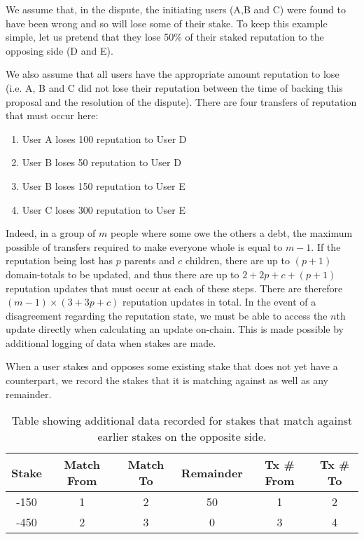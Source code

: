 We assume that, in the dispute, the initiating users (A,B and C) were found to have been wrong and so will lose some of their stake. To keep this example simple, let us pretend that they lose 50\% of their staked reputation to the opposing side (D and E).

We also assume that all users have the appropriate amount reputation to lose (i.e. A, B and C did not lose their reputation between the time of backing this proposal and the resolution of the dispute). There are four transfers of reputation that must occur here:

\begin{enumerate}
\item User A loses 100 reputation to User D
\item User B loses 50 reputation to User D
\item User B loses 150 reputation to User E
\item User C loses 300 reputation to User E
\end{enumerate}

Indeed, in a group of $m$ people where some owe the others a debt, the maximum possible of transfers required to make everyone whole is equal to $m-1$. If the reputation being lost has $p$ parents and $c$ children, there are up to $(p+1)$ domain-totals to be updated, and thus there are up to $2 + 2p + c + (p+1)$ reputation updates that must occur at each of these steps. There are therefore $\left(m-1\right)\times\left(3+3p+c\right)$ reputation updates in total. In the event of a disagreement regarding the reputation state, we must be able to access the $n$th update directly when calculating an update on-chain. This is made possible by additional logging of data when stakes are made.

When a user stakes and opposes some existing stake that does not yet have a counterpart, we record the stakes that it is matching against as well as any remainder.

\begin{table}[ht]
\centering
\caption{Table showing additional data recorded for stakes that match against earlier stakes on the opposite side.}
\begin{tabular}{|c|c|c|c|c|c|}
\hline
Stake & Match From & Match To & Remainder & Tx \# From & Tx \# To\\ \hline
-150  & 1          & 2        & 50      & 1 & 2 \\ \hline
-450  & 2          & 3        & 0       &  3 & 4 \\ \hline
\end{tabular}
\end{table}


